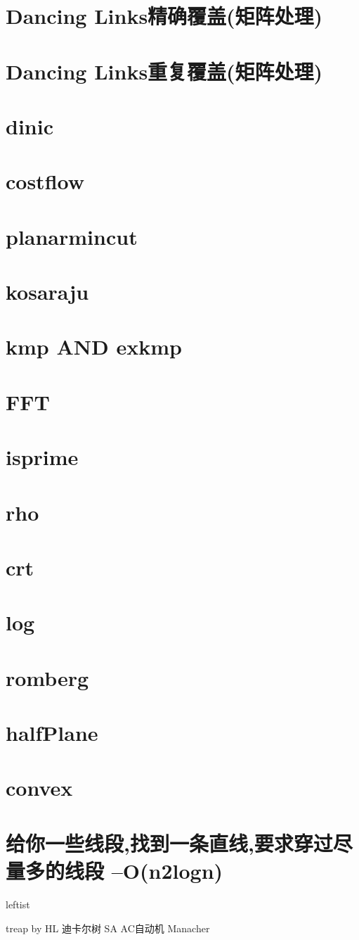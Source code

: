 \documentclass[
	10pt,
	twocolumn,
	a4paper,
]{article}
\begin{document}
\section{Dancing Links精确覆盖(矩阵处理)}

\section{Dancing Links重复覆盖(矩阵处理)}

\section{dinic}

\section{costflow}

\section{planarmincut}

\section{kosaraju}

\section{kmp AND exkmp}

\section{FFT}

\section{isprime}

\section{rho}

\section{crt}

\section{log}

\section{romberg}

\section{halfPlane}

\section{convex}

\section{给你一些线段,找到一条直线,要求穿过尽量多的线段 –O(n2logn)}




leftist

treap by HL
迪卡尔树
SA
AC自动机
Manacher
\end{document}
